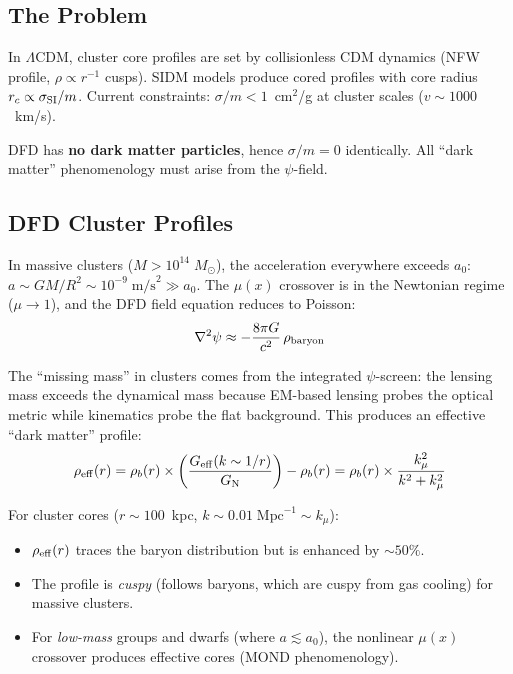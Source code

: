 \documentclass[11pt,a4paper]{article}
\newcounter{findingctr}
\newenvironment{finding}[1][]{%
  \refstepcounter{findingctr}%
  \begin{tcolorbox}[colback=blue!3!white, colframe=blue!50!black,
    title=\textbf{Finding \thefindingctr: #1}]
}{%
  \end{tcolorbox}%
}
\newcommand{\GN}{G_{\rm N}}
\newcommand{\Geff}{G_{\rm eff}}
\newcommand{\kmu}{k_\mu}
\begin{document}
\begin{finding}[\textbf{Cluster Cores}: NFW-Like from $\psi$-Field
  Nonlinearity, No DM Self-Interaction]

\subsection*{The Problem}

In $\Lambda$CDM, cluster core profiles are set by collisionless CDM
dynamics (NFW profile, $\rho \propto r^{-1}$ cusps).  SIDM models
produce cored profiles with core radius $r_c \propto \sigma_{\rm SI}/m$.
Current constraints: $\sigma/m < 1$~cm$^2$/g at cluster scales
($v \sim 1000$~km/s).

DFD has \textbf{no dark matter particles}, hence $\sigma/m = 0$
identically.  All ``dark matter'' phenomenology must arise from the
$\psi$-field.

\subsection*{DFD Cluster Profiles}

In massive clusters ($M > 10^{14}\;M_\odot$), the acceleration
everywhere exceeds $a_0$: $a \sim GM/R^2 \sim 10^{-9}\;\text{m/s}^2
\gg a_0$.  The $\mu(x)$ crossover is in the Newtonian regime
($\mu \to 1$), and the DFD field equation reduces to Poisson:
\begin{equation}
\nabla^2 \psi \approx -\frac{8\pi G}{c^2}\,\rho_{\rm baryon}
\end{equation}

The ``missing mass'' in clusters comes from the integrated
$\psi$-screen: the lensing mass exceeds the dynamical mass because
EM-based lensing probes the optical metric while kinematics probe
the flat background.  This produces an effective ``dark matter''
profile:
\begin{equation}
\rho_{\rm eff}(r) = \rho_b(r) \times
\left(\frac{\Geff(k \sim 1/r)}{\GN}\right) - \rho_b(r)
= \rho_b(r) \times \frac{\kmu^2}{k^2 + \kmu^2}
\end{equation}

For cluster cores ($r \sim 100$~kpc, $k \sim 0.01\;\text{Mpc}^{-1}
\sim \kmu$):
\begin{itemize}[nosep]
\item $\rho_{\rm eff}(r)$ traces the baryon distribution but is
  enhanced by $\sim 50\%$.
\item The profile is \emph{cuspy} (follows baryons, which are
  cuspy from gas cooling) for massive clusters.
\item For \emph{low-mass} groups and dwarfs (where $a \lesssim a_0$),
  the nonlinear $\mu(x)$ crossover produces effective cores
  (MOND phenomenology).
\end{itemize}


\end{finding}
\end{document}
